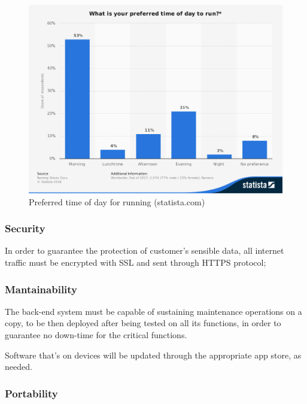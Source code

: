 \documentclass[../main.tex]{subfiles}
\begin{document}
\begin{figure}[H]
	\center
	\includegraphics[scale=0.35]{images/statista_runhours.png}
	\caption{Preferred time of day for running (statista.com)}
\end{figure}

\subsubsection{Security}

In order to guarantee the protection of customer's sensible data, all internet traffic must be encrypted with SSL and sent through HTTPS protocol;


\subsubsection{Mantainability}

The back-end system must be capable of sustaining maintenance operations on a copy, to be then deployed after being tested on all its functions, in order to guarantee no down-time for the critical functions.

Software that's on devices will be updated through the appropriate app store, as needed.

\subsubsection{Portability}
\end{document}
